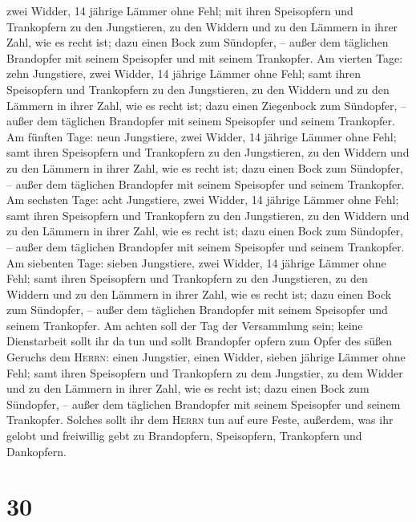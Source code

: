 zwei Widder, 14 jährige Lämmer ohne Fehl;  mit ihren
Speisopfern und Trankopfern zu den Jungstieren, zu den Widdern und zu
den Lämmern in ihrer Zahl, wie es recht ist;  dazu einen
Bock zum Sündopfer, -- außer dem täglichen Brandopfer mit seinem
Speisopfer und mit seinem Trankopfer.  Am vierten Tage:
zehn Jungstiere, zwei Widder, 14 jährige Lämmer ohne Fehl;
 samt ihren Speisopfern und Trankopfern zu den
Jungstieren, zu den Widdern und zu den Lämmern in ihrer Zahl, wie es
recht ist;  dazu einen Ziegenbock zum Sündopfer, -- außer
dem täglichen Brandopfer mit seinem Speisopfer und seinem Trankopfer.
 Am fünften Tage: neun Jungstiere, zwei Widder, 14
jährige Lämmer ohne Fehl;  samt ihren Speisopfern und
Trankopfern zu den Jungstieren, zu den Widdern und zu den Lämmern in
ihrer Zahl, wie es recht ist;  dazu einen Bock zum
Sündopfer, -- außer dem täglichen Brandopfer mit seinem Speisopfer und
seinem Trankopfer.  Am sechsten Tage: acht Jungstiere,
zwei Widder, 14 jährige Lämmer ohne Fehl;  samt ihren
Speisopfern und Trankopfern zu den Jungstieren, zu den Widdern und zu
den Lämmern in ihrer Zahl, wie es recht ist;  dazu einen
Bock zum Sündopfer, -- außer dem täglichen Brandopfer mit seinem
Speisopfer und seinem Trankopfer.  Am siebenten Tage:
sieben Jungstiere, zwei Widder, 14 jährige Lämmer ohne Fehl;
 samt ihren Speisopfern und Trankopfern zu den
Jungstieren, zu den Widdern und zu den Lämmern in ihrer Zahl, wie es
recht ist;  dazu einen Bock zum Sündopfer, -- außer dem
täglichen Brandopfer mit seinem Speisopfer und seinem Trankopfer.
 Am achten soll der Tag der Versammlung sein; keine
Dienstarbeit sollt ihr da tun  und sollt Brandopfer
opfern zum Opfer des süßen Geruchs dem \textsc{Herrn}: einen Jungstier,
einen Widder, sieben jährige Lämmer ohne Fehl;  samt
ihren Speisopfern und Trankopfern zu dem Jungstier, zu dem Widder und zu
den Lämmern in ihrer Zahl, wie es recht ist;  dazu einen
Bock zum Sündopfer, -- außer dem täglichen Brandopfer mit seinem
Speisopfer und seinem Trankopfer.  Solches sollt ihr dem
\textsc{Herrn} tun auf eure Feste, außerdem, was ihr gelobt und
freiwillig gebt zu Brandopfern, Speisopfern, Trankopfern und Dankopfern.

\hypertarget{section-29}{%
\section{30}\label{section-29}}

